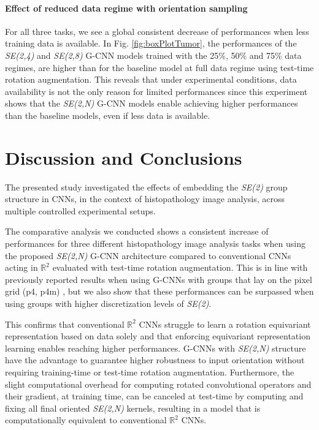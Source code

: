 \documentclass[twocolumn,final]{article}
\newcommand{\se}[1]{\textit{SE(#1)}}
\newcommand{\mset}[2]{$\mathbb{#1}^{#2}$}
\begin{document}
\paragraph{Effect of reduced data regime with orientation sampling} 
For all three tasks, we see a global consistent decrease of performances when less training data is available.
In Fig. \ref{fig:boxPlotTumor}, the performances of the \se{2,4} and \se{2,8} G-CNN models trained with the 25\%, 50\% and 75\% data regimes, are higher than for the baseline model at full data regime using test-time rotation augmentation.
This reveals that under experimental conditions, data availability is not the only reason for limited performances since this experiment shows that the \se{2,N} G-CNN models enable achieving higher performances than the baseline models, even if less data is available.


\section{Discussion and Conclusions}
\label{discussion}
The presented study investigated the effects of embedding the \se{2} group structure in CNNs, in the context of histopathology image analysis, across multiple controlled experimental setups.

The comparative analysis we conducted shows a consistent increase of performances for three different histopathology image analysis tasks when using the proposed \se{2,N} G-CNN architecture compared to conventional CNNs acting in \mset{R}{2} evaluated with test-time rotation augmentation.
This is in line with previously reported results when using G-CNNs with groups that lay on the pixel grid (p4, p4m) \citep{cohen2016group, veeling2018rotation}, but we also show that these performances can be surpassed when using groups with higher discretization levels of \se{2}.

This confirms that conventional \mset{R}{2} CNNs struggle to learn a rotation equivariant representation based on data solely and that enforcing equivariant representation learning enables reaching higher performances.
G-CNNs with \se{2,N} structure have the advantage to guarantee higher robustness to input orientation without requiring training-time or test-time rotation augmentation.
Furthermore, the slight computational overhead for computing rotated convolutional operators and their gradient, at training time, can be canceled at test-time by computing and fixing all final oriented \se{2,N} kernels, resulting in a model that is computationally equivalent to conventional \mset{R}{2} CNNs.
\end{document}
